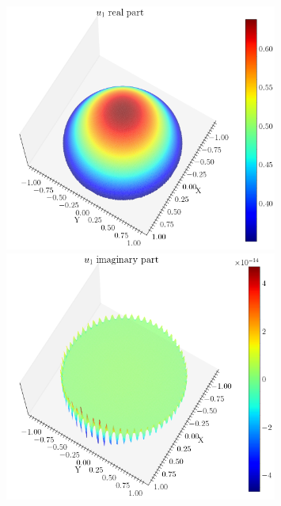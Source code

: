 \begin{figure}[!htb]
    \centering
    \begin{minipage}[b]{0.45\textwidth}
        \centering
        \includegraphics[width=0.8\textwidth]{Images/Dirac/circle_m_0_u1_re_points_158_inner_eta_05.png}
    \end{minipage}
    \hfill
    \begin{minipage}[b]{0.45\textwidth}
        \centering
        \includegraphics[width=0.8\textwidth]{Images/Dirac/circle_m_0_u1_im_points_158_inner_eta_05.png}
    \end{minipage}

    \vspace{0.5cm}


\end{figure}
